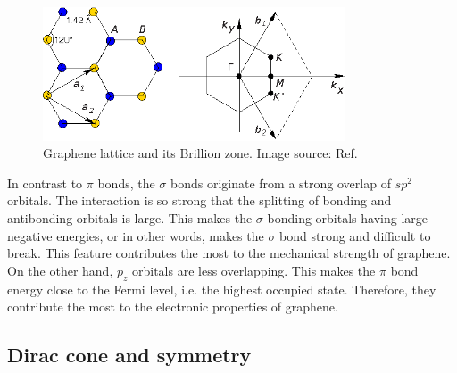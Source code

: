 \begin{figure}[htbp!] 
\centering  
\includegraphics[width=0.8\textwidth]{gra_lat.eps}
\caption{Graphene lattice and its Brillion zone. Image source: Ref. \cite{CastroNeto2009} }  
\label{fig:gra_lat}
\end{figure} 

In contrast to $\pi$ bonds, the $\sigma$ bonds originate from a strong overlap of $sp^2$ orbitals. The interaction is so strong that the splitting of bonding and antibonding orbitals is large. This makes the $\sigma$ bonding orbitals having large negative energies, or in other words, makes the $\sigma$ bond strong and difficult to break. This feature contributes the most to the mechanical strength of graphene. On the other hand, $p_z$ orbitals are less overlapping. This makes the $\pi$ bond energy close to the Fermi level, i.e. the highest occupied state. Therefore, they contribute the most to the electronic properties of graphene.  


\subsection{Dirac cone and symmetry}

